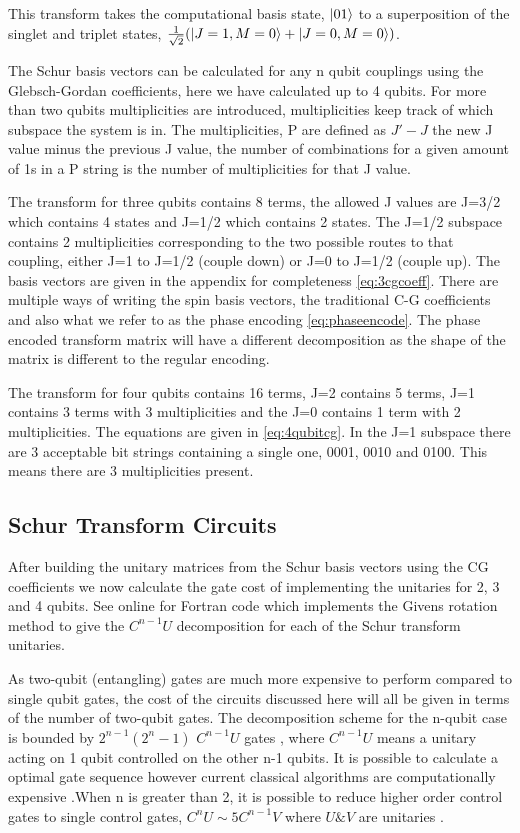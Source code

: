 \documentclass[12pt]{article}
\begin{document}
This transform takes the computational basis state, $\left\vert{01}\right\rangle$ to a superposition of the singlet and triplet states, $\frac{1}{\sqrt{2}} (\left\vert{J=1, M=0}\right\rangle + \left\vert{J=0, M=0}\right\rangle)$. 

The Schur basis vectors can be calculated for any n qubit couplings using the Glebsch-Gordan coefficients, here we have calculated up to 4 qubits. For more than two qubits multiplicities are introduced, multiplicities keep track of which subspace the system is in. The multiplicities, P are defined as $J'-J$ the new J value minus the previous J value, the number of combinations for a given amount of 1s in a P string is the number of multiplicities for that J value.

The transform for three qubits contains 8 terms, the allowed J values are J=3/2 which contains 4 states and J=1/2 which contains 2 states. The J=1/2 subspace contains 2 multiplicities corresponding to the two possible routes to that coupling, either J=1 to J=1/2 (couple down) or J=0 to J=1/2 (couple up). The basis vectors are given in the appendix for completeness \autoref{eq:3cgcoeff}. There are multiple ways of writing the spin basis vectors, the traditional C-G coefficients and also what we refer to as the phase encoding \autoref{eq:phaseencode}. The phase encoded transform matrix will have a different decomposition as the shape of the matrix is different to the regular encoding. 

The transform for four qubits contains 16 terms, J=2 contains 5 terms, J=1 contains 3 terms with 3 multiplicities and the J=0 contains 1 term with 2 multiplicities. The equations are given in \autoref{eq:4qubitcg}. In the J=1 subspace there are 3 acceptable bit strings containing a single one, 0001, 0010 and 0100. This means there are 3 multiplicities present. 

\subsection{Schur Transform Circuits}

After building the unitary matrices from the Schur basis vectors using the CG coefficients we now calculate the gate cost of implementing the unitaries for 2, 3 and 4 qubits. See online \cite{githubot561} for Fortran code which implements the Givens rotation method to give the $C^{n-1}U$ decomposition for each of the Schur transform unitaries. 

As two-qubit (entangling) gates are much more expensive to perform compared to single qubit gates, the cost of the circuits discussed here will all be given in terms of the number of two-qubit gates. The decomposition scheme for the n-qubit case is bounded by $2^{n-1}(2^n-1)$ $C^{n-1}U$ gates \cite{li2013decomposition}, where $C^{n-1}U$ means a unitary acting on 1 qubit controlled on the other n-1 qubits. It is possible to calculate a optimal gate sequence however current classical algorithms are computationally expensive \cite{sridharan2010reduced}.When n is greater than 2, it is possible to reduce higher order control gates to single control gates, $C^nU \sim 5 C^{n-1}V$ where $U \& V$ are unitaries \cite{barenco1995elementary}.
\end{document}
